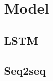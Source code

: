 %
\chapter{Model}
\label{sec:model}

\section{LSTM}
\label{sec:model:LSTM}


\section{Seq2seq}
\label{sec:model:seq2seq}


